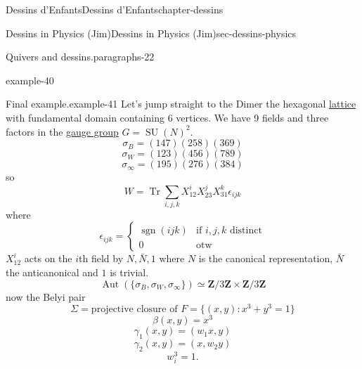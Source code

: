 \documentclass[oneside,10pt,]{book}
\numberwithin{equation}{section}
\newcommand{\ZZ}{\mathbf{Z}}
\DeclareMathOperator{\sgn}{sgn}
\DeclareMathOperator{\trace}{Tr}
\DeclareMathOperator{\Aut}{Aut}
\DeclareMathOperator{\specialunitary}{SU}
\newcommand{\amp}{&}
\begin{document}
\begin{chapterptx}{Dessins d'Enfants}{}{Dessins d'Enfants}{}{}{chapter-dessins}
\begin{sectionptx}{Dessins in Physics (Jim)}{}{Dessins in Physics (Jim)}{}{}{sec-dessins-physics}
\begin{paragraphs}{Quivers and dessins.}{paragraphs-22}
\begin{example}{}{example-40}
\end{example}
\begin{example}{Final example.}{example-41}%
\hypertarget{p-781}{}%
Let's jump straight to the Dimer the hexagonal \hyperref[def-buntes-lattice]{lattice} with fundamental domain containing 6 vertices. We have 9 fields and three factors in the \hyperref[def-gauge-transformations]{gauge group} \(G = \specialunitary (N)^2\).%
\begin{equation*}
\sigma_B = (147)(258)(369)
\end{equation*}
%
\begin{equation*}
\sigma_W = (123)(456)(789)
\end{equation*}
%
\begin{equation*}
\sigma_\infty = (195)(276)(384)
\end{equation*}
so%
\begin{equation*}
W = \trace \sum_{i,j,k} X_{12}^iX_{23}^j X_{31}^k \epsilon_{ijk}
\end{equation*}
where%
\begin{equation*}
\epsilon_{ijk} = \begin{cases} \sgn(ijk) \amp\text{if }i,j,k \text{ distinct}\\ 0 \amp\text{otw}\end{cases}
\end{equation*}
\(X_{12}^i\) acts on the \(i\)th field by \(N, \bar N, 1\) where \(N\) is the canonical representation, \(\bar N\) the anticanonical and \(1\) is trivial.%
\begin{equation*}
\Aut(\{\sigma_B,\sigma_W, \sigma_\infty\})  \simeq \ZZ/3\ZZ\times \ZZ/3\ZZ
\end{equation*}
now the Belyi pair%
\begin{equation*}
\Sigma = \text{projective closure of } F = \{(x,y) : x^3+ y^3 =1\}
\end{equation*}
%
\begin{equation*}
\beta(x,y) = x^3
\end{equation*}
%
\begin{equation*}
\gamma_1(x,y) = (w_1 x, y)
\end{equation*}
%
\begin{equation*}
\gamma_2(x,y) = (x,w_2  y)
\end{equation*}
%
\begin{equation*}
w_i^3 = 1\text{.}
\end{equation*}
%
\end{example}
\end{paragraphs}%
\end{sectionptx}
\end{chapterptx}
\end{document}
